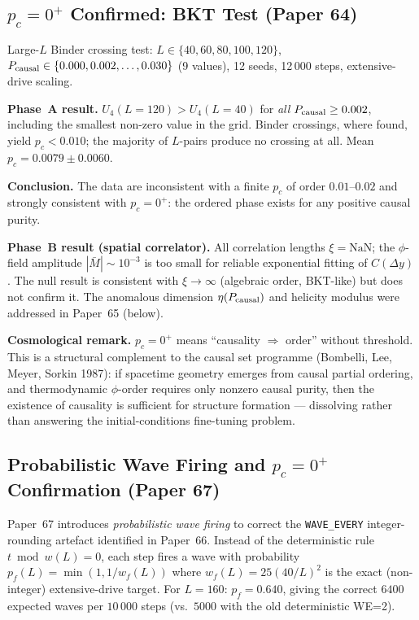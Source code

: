 \documentclass[11pt]{article}
\begin{document}
\subsection{$p_c = 0^+$ Confirmed: BKT Test (Paper 64)}

Large-$L$ Binder crossing test:
$L \in \{40,60,80,100,120\}$,
$P_{\rm causal} \in \{0.000, 0.002, \ldots, 0.030\}$ (9 values),
12 seeds, 12\,000 steps, extensive-drive scaling.

\textbf{Phase~A result.}
$U_4(L=120) > U_4(L=40)$ for \emph{all} $P_{\rm causal} \geq 0.002$,
including the smallest non-zero value in the grid.
Binder crossings, where found, yield $p_c < 0.010$;
the majority of $L$-pairs produce no crossing at all.
Mean $p_c = 0.0079 \pm 0.0060$.

\textbf{Conclusion.}
The data are inconsistent with a finite $p_c$ of order $0.01$--$0.02$
and strongly consistent with $p_c = 0^+$:
the ordered phase exists for any positive causal purity.

\textbf{Phase~B result (spatial correlator).}
All correlation lengths $\xi = \mathrm{NaN}$;
the $\phi$-field amplitude $|\bar{M}| \sim 10^{-3}$ is too small
for reliable exponential fitting of $C(\Delta y)$.
The null result is consistent with $\xi \to \infty$ (algebraic order,
BKT-like) but does not confirm it.
The anomalous dimension $\eta(P_{\rm causal})$ and helicity modulus
were addressed in Paper~65 (below).

\textbf{Cosmological remark.}
$p_c = 0^+$ means ``causality $\Rightarrow$ order'' without threshold.
This is a structural complement to the causal set programme
(Bombelli, Lee, Meyer, Sorkin 1987):
if spacetime geometry emerges from causal partial ordering,
and thermodynamic $\phi$-order requires only nonzero causal purity,
then the existence of causality is sufficient for structure formation ---
dissolving rather than answering the initial-conditions fine-tuning problem.

\subsection{Probabilistic Wave Firing and $p_c=0^+$ Confirmation (Paper 67)}

Paper~67 introduces \emph{probabilistic wave firing} to correct the
\texttt{WAVE\_EVERY} integer-rounding artefact identified in Paper~66.
Instead of the deterministic rule $t \bmod w(L) = 0$, each step fires
a wave with probability $p_f(L)=\min(1,1/w_f(L))$ where
$w_f(L)=25(40/L)^2$ is the exact (non-integer) extensive-drive target.
For $L=160$: $p_f=0.640$, giving the correct $6400$ expected waves
per $10\,000$ steps (vs.\ $5000$ with the old deterministic WE=2).
\end{document}
